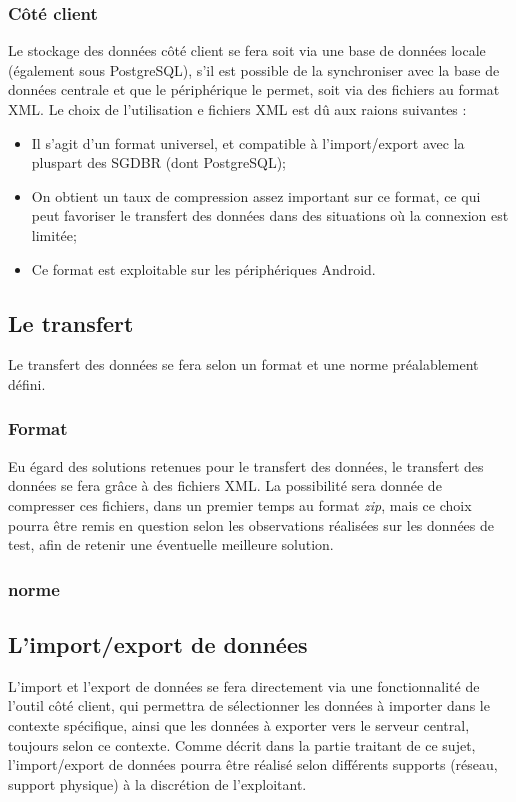 \subsubsection{Côté client}

Le stockage des données côté client se fera soit via une base de données locale (également sous PostgreSQL), s'il est possible de la synchroniser avec la base de données centrale et que le périphérique le permet, soit via des fichiers au format XML.
Le choix de l'utilisation e fichiers XML est dû aux raions suivantes :
\begin{itemize}
	\item Il s'agit d'un format universel, et compatible à l'import/export avec la pluspart des SGDBR (dont PostgreSQL);
	\item On obtient un taux de compression assez important sur ce format, ce qui peut favoriser le transfert des données dans des situations où la connexion est limitée;
	\item Ce format est exploitable sur les périphériques Android.
\end{itemize}

\subsection{Le transfert}
Le transfert des données se fera selon un format et une norme préalablement défini.

\subsubsection{Format}
Eu égard des solutions retenues pour le transfert des données, le transfert des données se fera grâce à des fichiers XML.
La possibilité sera donnée de compresser ces fichiers, dans un premier temps au format \textit{zip}, mais ce choix pourra être remis en question selon les observations réalisées sur les données de test, afin de retenir une éventuelle meilleure solution.

\subsubsection{norme}
% 
% 

\subsection{L'import/export de données}

L'import et l'export de données se fera directement via une fonctionnalité de l'outil côté client, qui permettra de sélectionner les données à importer dans le contexte spécifique, ainsi que les données à exporter vers le serveur central, toujours selon ce contexte.
Comme décrit dans la partie traitant de ce sujet, l'import/export de données pourra être réalisé selon différents supports (réseau, support physique) à la discrétion de l'exploitant.


	

